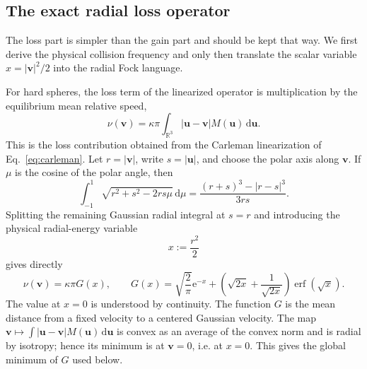 \documentclass[11pt]{article}
\numberwithin{equation}{section}
\newcommand{\R}{\mathbb R}
\newcommand{\dd}{\,\mathrm d}
\newcommand{\e}{\mathrm e}
\theoremstyle{definition}
\begin{document}
\subsection{The exact radial loss operator}

The loss part is simpler than the gain part and should be kept that way.  We
first derive the physical collision frequency and only then translate the
scalar variable $x=|\bm v|^2/2$ into the radial Fock language.

For hard spheres, the loss term of the linearized operator is multiplication
by the equilibrium mean relative speed,
\begin{equation}
 \nu(\bm v)
 =\kappa\pi\int_{\R^3}|\bm u-\bm v|M(\bm u)\dd\bm u.
 \label{eq:nu_mean_relative_speed}
\end{equation}
This is the loss contribution obtained from the Carleman linearization of
Eq.~\eqref{eq:carleman}.  Let $r=|\bm v|$, write $s=|\bm u|$, and choose the
polar axis along $\bm v$.  If $\mu$ is the cosine of the polar angle, then
\begin{equation}
 \int_{-1}^{1}\sqrt{r^2+s^2-2rs\mu}\dd\mu
 =\frac{(r+s)^3-|r-s|^3}{3rs}.
 \label{eq:relative_speed_angular_integral}
\end{equation}
Splitting the remaining Gaussian radial integral at $s=r$ and introducing the
physical radial-energy variable
\begin{equation}
 x:=\frac{r^2}{2}
\end{equation}
gives directly
\begin{equation}
 \nu(\bm v)=\kappa\pi G(x),
 \qquad
 G(x)=
 \sqrt{\frac2\pi}\e^{-x}
 +\left(\sqrt{2x}+\frac1{\sqrt{2x}}\right)
 \operatorname{erf}(\sqrt x).
 \label{eq:G_reintroduced}
\end{equation}
The value at $x=0$ is understood by continuity.  The function $G$ is the mean
distance from a fixed velocity to a centered Gaussian velocity.  The map
$\bm v\mapsto\int|\bm u-\bm v|M(\bm u)\dd\bm u$ is convex as an
average of the convex norm and is radial by isotropy; hence its minimum is at
$\bm v=0$, i.e. at $x=0$.  This gives the global minimum of $G$ used below.
\end{document}
